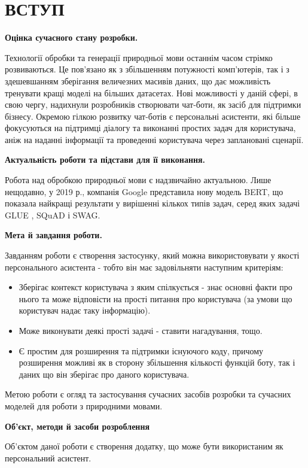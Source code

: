 \chapter*{ВСТУП}
\textbf{Оцінка сучасного стану розробки.} 

Технології обробки та генерації природньої мови останнім часом стрімко розвиваються. Це пов'язано як з збільшенням потужності комп'ютерів, так і з здешевшанням зберігання величезних масивів даних, що дає можливість тренувати кращі моделі на більших датасетах. Нові можливості у даній сфері, в свою чергу, надихнули розробників створювати чат-боти, як засіб для підтримки бізнесу. Окремою гілкою розвитку чат-ботів є персональні асистенти, які більше фокусуються на підтримці діалогу та виконанні простих задач для користувача, аніж на наданні інформації та проведенні користувача через заплановані сценарії.


\textbf{Актуальність роботи та підстави для її виконання.}

Робота над обробкою природньої мови є надзвичайно актуальною. Лише нещодавно, у 2019 р., компанія Google представила нову модель BERT, що показала найкращі результати у вирішенні кількох типів задач, серед яких задачі GLUE , SQuAD і SWAG. 


\textbf{Мета й завдання роботи.} 

Завданням роботи є створення застосунку, який можна використовувати у якості персонального асистента - тобто він має задовільняти наступним критеріям: 
\begin{itemize}
\item Зберігає контекст користувача з яким спілкується - знає основні факти про нього та може відповісти на прості питання про користувача (за умови що користувач надає таку інформацію). 
\item Може виконувати деякі прості задачі - ставити нагадування, тощо.
\item Є простим для розширення та підтримки існуючого коду, причому розширення можливі як в сторону збільшення кількості функцій боту, так і даних що він зберігає про даного користувача.
\end{itemize}

 Метою роботи є огляд та застосування сучасних засобів розробки та сучасних моделей для роботи з природними мовами. 
 
 
\textbf{ Об'єкт, методи й засоби розроблення}

Об'єктом даної роботи є створення додатку, що може бути використаним як персональний асистент.


